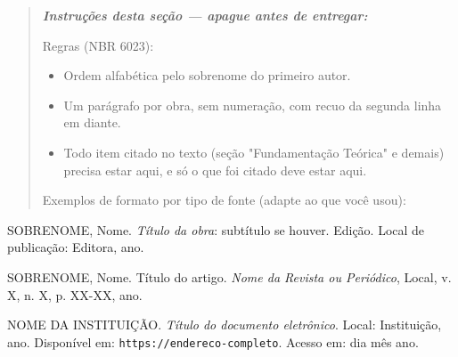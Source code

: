 \documentclass[article,12pt,a4paper,oneside]{abntex2}
\newenvironment{instrucoes}{%
  \begin{quotation}\footnotesize\itshape
  \noindent\textbf{\upshape Instruções desta seção — apague antes de entregar:}\par\smallskip
}{%
  \end{quotation}
}
\begin{document}
\begin{instrucoes}
Regras (NBR 6023):
\begin{itemize}
  \item Ordem alfabética pelo sobrenome do primeiro autor.
  \item Um parágrafo por obra, sem numeração, com recuo da segunda linha em diante.
  \item Todo item citado no texto (seção "Fundamentação Teórica" e demais) precisa estar aqui, e só o que foi citado deve estar aqui.
\end{itemize}
Exemplos de formato por tipo de fonte (adapte ao que você usou):
\end{instrucoes}

\newcommand{\referencia}[1]{\par\noindent\hangindent=1cm #1\par\medskip}

\referencia{SOBRENOME, Nome. \textit{Título da obra}: subtítulo se houver.
Edição. Local de publicação: Editora, ano.}

\referencia{SOBRENOME, Nome. Título do artigo. \textit{Nome da Revista ou
Periódico}, Local, v. X, n. X, p. XX-XX, ano.}

\referencia{NOME DA INSTITUIÇÃO. \textit{Título do documento eletrônico}.
Local: Instituição, ano. Disponível em: \texttt{https://endereco-completo}.
Acesso em: dia mês ano.}
\end{document}
